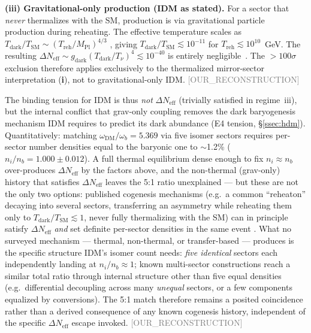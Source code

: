 \documentclass[twocolumn,prd,amsmath,amssymb,floatfix]{revtex4-2}
\newcommand{\reconstruction}{\textcolor{gray}{\small[OUR\_RECONSTRUCTION]}}
\begin{document}
\textbf{(iii) Gravitational-only production (IDM as stated).}
For a sector that \emph{never} thermalizes with the SM, production is via
gravitational particle production during reheating.  The effective temperature
scales as $T_\mathrm{dark}/T_\mathrm{SM} \sim (T_\mathrm{reh}/M_\mathrm{Pl})^{4/3}$
\cite{clery2021}, giving $T_\mathrm{dark}/T_\mathrm{SM} \lesssim 10^{-11}$ for
$T_\mathrm{reh} \lesssim 10^{10}$~GeV.  The resulting
$\Delta N_\mathrm{eff} \sim g_\mathrm{dark}(T_\mathrm{dark}/T_\nu)^4 \lesssim 10^{-40}$
is entirely negligible~\cite{clery2021,farina2018}.
The $>100\sigma$ exclusion therefore applies exclusively to the thermalized
mirror-sector interpretation (\textbf{i}), not to gravitational-only IDM.
\reconstruction

The binding tension for IDM is thus \emph{not} $\Delta N_\mathrm{eff}$
(trivially satisfied in regime~iii), but the internal conflict that
grav-only coupling removes the dark baryogenesis mechanism IDM requires
to predict its dark abundance (E4 tension, §\ref{ssec:hdm}).
Quantitatively: matching $\omega_\mathrm{DM}/\omega_b = 5.369$ via five isomer
sectors requires per-sector number densities equal to the baryonic one to
$\sim$1.2\% ($n_i/n_b = 1.000 \pm 0.012$). A full thermal equilibrium
dense enough to fix $n_i \approx n_b$ over-produces $\Delta N_\mathrm{eff}$ by
the factors above, and the non-thermal (grav-only) history that satisfies
$\Delta N_\mathrm{eff}$ leaves the 5:1 ratio unexplained --- but these are not
the only two options: published cogenesis mechanisms (e.g.\ a common
``reheaton'' decaying into several sectors, transferring an asymmetry while
reheating them only to $T_\mathrm{dark}/T_\mathrm{SM}\lesssim1$, never fully
thermalizing with the SM) can in principle satisfy $\Delta N_\mathrm{eff}$
\emph{and} set definite per-sector densities in the same event
\cite{easa2022}. What no surveyed mechanism --- thermal, non-thermal, or
transfer-based --- produces is the specific structure IDM's isomer count
needs: \emph{five identical} sectors each independently landing at
$n_i/n_b\approx1$; known multi-sector constructions reach a similar total
ratio through internal structure other than five equal densities (e.g.\
differential decoupling across many \emph{unequal} sectors, or a few
components equalized by conversions). The 5:1 match therefore remains a
posited coincidence rather than a derived consequence of any known cogenesis
history, independent of the specific $\Delta N_\mathrm{eff}$ escape invoked.
\reconstruction

\end{document}
